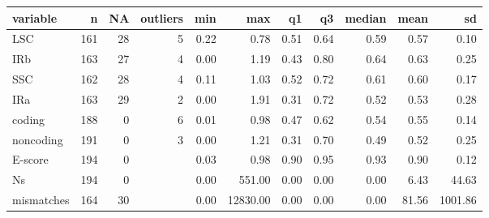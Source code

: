 \begin{table}[ht]
\centering
\begin{tabular}{lrrrrrrrrrr}
  \hline
variable & n & NA & outliers & min & max & q1 & q3 & median & mean & sd \\ 
  \hline
LSC & 161 & 28 & 5 & 0.22 & 0.78 & 0.51 & 0.64 & 0.59 & 0.57 & 0.10 \\ 
  IRb & 163 & 27 & 4 & 0.00 & 1.19 & 0.43 & 0.80 & 0.64 & 0.63 & 0.25 \\ 
  SSC & 162 & 28 & 4 & 0.11 & 1.03 & 0.52 & 0.72 & 0.61 & 0.60 & 0.17 \\ 
  IRa & 163 & 29 & 2 & 0.00 & 1.91 & 0.31 & 0.72 & 0.52 & 0.53 & 0.28 \\ 
  coding & 188 & 0 & 6 & 0.01 & 0.98 & 0.47 & 0.62 & 0.54 & 0.55 & 0.14 \\ 
  noncoding & 191 & 0 & 3 & 0.00 & 1.21 & 0.31 & 0.70 & 0.49 & 0.52 & 0.25 \\ 
  E-score & 194 & 0 &  & 0.03 & 0.98 & 0.90 & 0.95 & 0.93 & 0.90 & 0.12 \\ 
  Ns & 194 & 0 &  & 0.00 & 551.00 & 0.00 & 0.00 & 0.00 & 6.43 & 44.63 \\ 
  mismatches & 164 & 30 &  & 0.00 & 12830.00 & 0.00 & 0.00 & 0.00 & 81.56 & 1001.86 \\ 
   \hline
\end{tabular}
\end{table}
